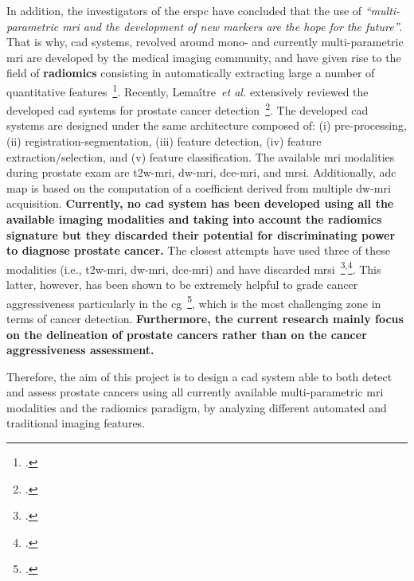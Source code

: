 In addition, the investigators of the \ac{erspc} have concluded that the use of \emph{``multi-parametric \ac{mri} and the development of new markers are the hope for the future''}.
That is why, \ac{cad} systems, revolved around mono- and currently multi-parametric \ac{mri} are developed by the medical imaging community, and have given rise to the field of \textbf{radiomics} consisting in automatically extracting large a number of quantitative features~\footcite{lambin2012radiomics}.
Recently, Lema\^itre~\emph{et al.} extensively reviewed the developed \ac{cad} systems for prostate cancer detection~\footcite{Lemaitre2015}.
The developed \ac{cad} systems are designed under the same architecture composed of: (i) pre-processing, (ii) registration-segmentation, (iii) feature detection, (iv) feature extraction/selection, and (v) feature classification.
The available \ac{mri} modalities during prostate exam are \ac{t2w}-\ac{mri}, \ac{dw}-\ac{mri}, \ac{dce}-\ac{mri}, and \ac{mrsi}. 
Additionally, \ac{adc} map is based on the computation of a coefficient derived from multiple \ac{dw}-\ac{mri} acquisition.
\textbf{Currently, no \ac{cad} system has been developed using all the available imaging modalities and taking into account the radiomics signature but they discarded their potential for discriminating power to diagnose prostate cancer.}
The closest attempts have used three of these modalities (i.e., \ac{t2w}-\ac{mri}, \ac{dw}-\ac{mri}, \ac{dce}-\ac{mri}) and have discarded \ac{mrsi}~\footcite{Litjens2014}\textsuperscript{,}\footcite{Viswanath2011}.
This latter, however, has been shown to be extremely helpful to grade cancer aggressiveness particularly in the \ac{cg}~\footcite{Vos2015}, which is the most challenging zone in terms of cancer detection.
\textbf{Furthermore, the current research mainly focus on the delineation of prostate cancers rather than on the cancer aggressiveness assessment.}

% 

Therefore, the aim of this project is to design a \ac{cad} system able to both detect and assess prostate cancers using all currently available multi-parametric \ac{mri} modalities and the radiomics paradigm, by analyzing different automated and traditional imaging features.

